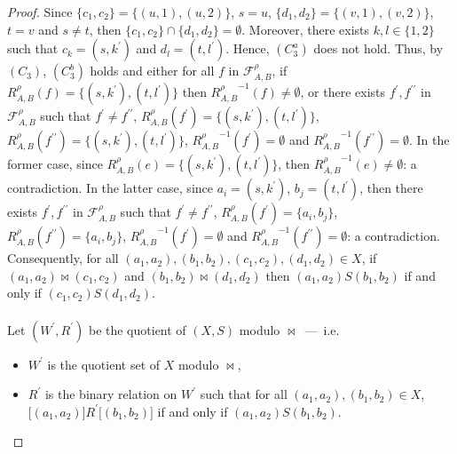 \documentclass[10pt,a4paper]{amsart}
\begin{document}
\begin{proof}
Since $\{c_{1},c_{2}\}{=}\{(u,1),(u,2)\}$, $s{=}u$, $\{d_{1},d_{2}\}{=}\{(v,1),(v,2)\}$, $t{=}v$ and $s{\not=}t$, then $\{c_{1},
%
%
%
%
%
%
%
%
%
%
%
%
$\linebreak$
%
%
%
%
%
%
%
%
%
%
%
%
c_{2}\}{\cap}\{d_{1},d_{2}\}{=}\emptyset$.
Moreover, there exists $k,l{\in}\{1,2\}$ such that $c_{k}{=}(s,k^{\prime})$ and $d_{l}{=}(t,l^{\prime})$.
Hence, $(C_{3}^{a})$ does not hold.
Thus, by $(C_{3})$, $(C_{3}^{b})$ holds and either for all $f$ in ${\mathcal F}_{A,B}^{\rho}$, if $R_{A,B}^{\rho}(f){=}\{(s,k^{\prime}),(t,l^{\prime})\}$ then ${R_{A,B}^{\rho}}^{{-}1}(f){\not=}\emptyset$, or there exists $f^{\prime},f^{\prime\prime}$ in ${\mathcal F}_{A,B}^{\rho}$ such that $f^{\prime}{\not=}f^{\prime\prime}$, $R_{A,B}^{\rho}(f^{\prime}){=}\{(s,k^{\prime}),(t,l^{\prime})\}$, $R_{A,B}^{\rho}(f^{\prime\prime}){=}\{(s,k^{\prime}),(t,l^{\prime})\}$, ${R_{A,B}^{\rho}}^{{-}1}(f^{\prime}){=}\emptyset$ and ${R_{A,B}^{\rho}}^{{-}1}(f^{\prime\prime}){=}\emptyset$.
In the former case, since $R_{A,B}^{\rho}(e){=}\{(s,k^{\prime}),
%
%
%
%
%
%
%
%
%
%
%
%
$\linebreak$
%
%
%
%
%
%
%
%
%
%
%
%
(t,l^{\prime})\}$, then ${R_{A,B}^{\rho}}^{{-}1}(e){\not=}\emptyset$: a contradiction.
In the latter case, since $a_{i}{=}(s,k^{\prime})$, $b_{j}{=}(t,l^{\prime})$, then there exists $f^{\prime},f^{\prime\prime}$ in ${\mathcal F}_{A,B}^{\rho}$ such that $f^{\prime}{\not=}f^{\prime\prime}$, $R_{A,B}^{\rho}(f^{\prime}){=}\{a_{i},b_{j}\}$, $R_{A,B}^{\rho}(f^{\prime\prime}){=}\{a_{i},b_{j}\}$, ${R_{A,B}^{\rho}}^{{-}1}(f^{\prime}){=}\emptyset$ and ${R_{A,B}^{\rho}}^{{-}1}(f^{\prime\prime}){=}\emptyset$: a contradiction.
Consequently, for all $(a_{1},a_{2}),(b_{1},b_{2}),(c_{1},c_{2}),(d_{1},d_{2}){\in}X$, if $(a_{1},a_{2}){\bowtie}(c_{1},c_{2})$ and $(b_{1},b_{2}){\bowtie}(d_{1},d_{2})$ then $(a_{1},a_{2}){S}(b_{1},b_{2})$ if and only if $(c_{1},c_{2}){S}(d_{1},d_{2})$.
%
%
\\
\\
%
%
Let $(W^{\prime},R^{\prime})$ be the quotient of $(X,S)$ modulo $\bowtie$~---~i.e.
%
%
\begin{itemize}
%
%
\item $W^{\prime}$ is the quotient set of $X$ modulo $\bowtie$,
%
%
\item $R^{\prime}$ is the binary relation on $W^{\prime}$ such that for all $(a_{1},a_{2}),(b_{1},b_{2}){\in}X$, $\lbrack(a_{1},a_{2})\rbrack{R^{\prime}}\lbrack(b_{1},b_{2})\rbrack$ if and only if $(a_{1},a_{2}){S}(b_{1},b_{2})$.
%
%
\end{itemize}

\end{proof}
\end{document}
